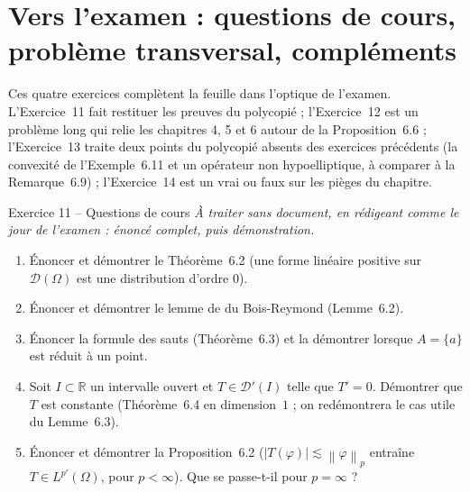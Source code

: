 \documentclass[11pt,a4paper]{article}
\newcommand{\R}{\mathbb{R}}
\newcommand{\norm}[1]{\left\|#1\right\|}
\newcommand{\D}{\mathcal{D}}
\theoremstyle{definition}
\begin{document}
\section*{Vers l'examen : questions de cours, problème transversal, compléments}

\begin{commentaire}
Ces quatre exercices complètent la feuille dans l'optique de l'examen. L'Exercice~11 fait restituer les preuves du polycopié ; l'Exercice~12 est un problème long qui relie les chapitres 4, 5 et 6 autour de la Proposition~6.6 ; l'Exercice~13 traite deux points du polycopié absents des exercices précédents (la convexité de l'Exemple~6.11 et un opérateur non hypoelliptique, à comparer à la Remarque~6.9) ; l'Exercice~14 est un vrai ou faux sur les pièges du chapitre.
\end{commentaire}

\begin{exo}{Exercice 11 -- Questions de cours}
\emph{À traiter sans document, en rédigeant comme le jour de l'examen : énoncé complet, puis démonstration.}
\begin{enumerate}[label=(\alph*)]
  \item Énoncer et démontrer le Théorème~6.2 (une forme linéaire positive sur $\D(\Omega)$ est une distribution d'ordre $0$).
  \item Énoncer et démontrer le lemme de du Bois-Reymond (Lemme~6.2).
  \item Énoncer la formule des sauts (Théorème~6.3) et la démontrer lorsque $A=\{a\}$ est réduit à un point.
  \item Soit $I\subset\R$ un intervalle ouvert et $T\in\D'(I)$ telle que $T'=0$. Démontrer que $T$ est constante (Théorème~6.4 en dimension~$1$ ; on redémontrera le cas utile du Lemme~6.3).
  \item Énoncer et démontrer la Proposition~6.2 ($|T(\varphi)|\lesssim\norm\varphi_p$ entraîne $T\in L^{p'}(\Omega)$, pour $p<\infty$). Que se passe-t-il pour $p=\infty$ ?
\end{enumerate}
\end{exo}
\end{document}
